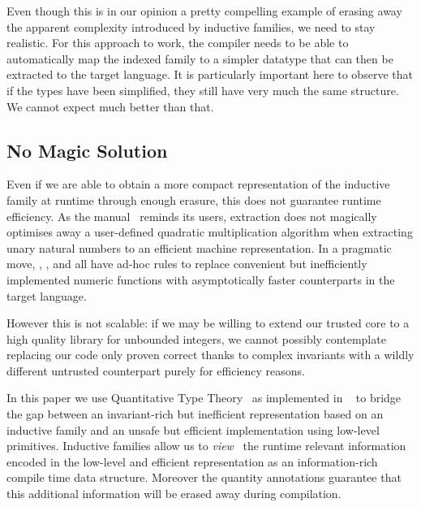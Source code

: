 
Even though this is in our opinion a pretty compelling example of erasing away the
apparent complexity introduced by inductive families, we need to stay
realistic.
%
For this approach to work, the compiler needs to be able to automatically map the
indexed family to a simpler datatype that can then be extracted to the target language.
%
It is particularly important here to observe that if the types have been simplified,
they still have very much the same structure. We cannot expect much better than that.

\subsection{No Magic Solution}

Even if we are able to obtain a more compact representation of the inductive
family at runtime through enough erasure, this does not guarantee runtime efficiency.
As the \coq{} manual~\cite{Coq:manual} reminds its users, extraction does not magically
optimises away a user-defined quadratic multiplication algorithm when extracting unary
natural numbers to an efficient machine representation.
%
In a pragmatic move, \coq{}, \agda{}, and \idris{} all have ad-hoc rules to replace
convenient but inefficiently implemented numeric functions with asymptotically faster
counterparts in the target language.

However this is not scalable: if we may be willing to extend our trusted core to a
high quality library for unbounded integers, we cannot possibly contemplate replacing
our code only proven correct thanks to complex invariants with a wildly different
untrusted counterpart purely for efficiency reasons.

In this paper we use Quantitative Type
Theory~\cite{DBLP:conf/birthday/McBride16,DBLP:conf/lics/Atkey18}
as implemented in \idris{}~\cite{DBLP:conf/ecoop/Brady21} to bridge the gap between
an invariant-rich but inefficient representation based on an inductive family and
an unsafe but efficient implementation using low-level primitives.
%
Inductive families allow us to \emph{view}~\cite{DBLP:journals/jfp/McBrideM04} the
runtime relevant information encoded in the low-level and efficient representation
as an information-rich compile time data structure. Moreover the quantity annotations
guarantee that this additional information will be erased away during compilation.
